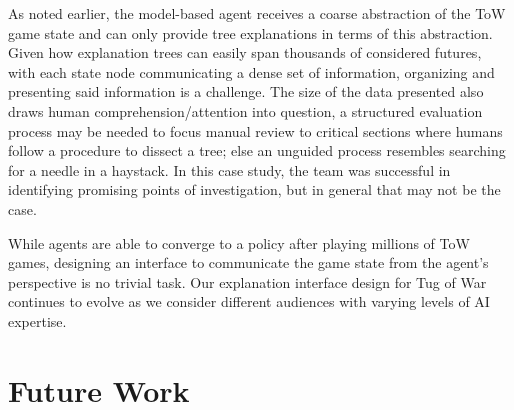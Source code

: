 \documentclass{article}
\begin{document}
As noted earlier, the model-based agent receives a coarse abstraction of the ToW game state and can only provide tree explanations in terms of this  abstraction. Given how explanation trees can easily span thousands of considered futures, with each state node communicating a dense set of information, organizing and presenting said information is a challenge. The size of the data presented also draws human comprehension/attention into question, a structured evaluation process may be needed to focus manual review to critical sections where humans follow a procedure to dissect a tree; else an unguided process resembles searching for a needle in a haystack. In this case study, the team was successful in identifying promising points of investigation, but in general that may not be the case. 

While agents are able to converge to a policy after playing millions of ToW games, designing an interface to communicate the game state from the agent's perspective is no trivial task. Our explanation interface design for Tug of War continues to evolve as we consider different audiences with varying levels of AI expertise.


\section{Future Work}


\end{document}
